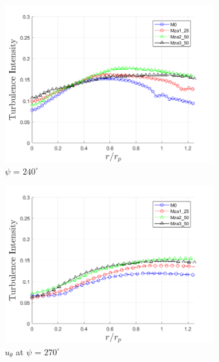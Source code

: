 \begin{figure}[H]
	\centering
	\begin{subfigure}[b]{0.475\textwidth}
		\centering
		\includegraphics[width=1\textwidth]{figures/zonal_adapt_results/LEV/u_theta/TI_phase_240.png}
		\caption{$\psi$ = $240^\circ$}
		\label{fig:zonal_TI_240}
	\end{subfigure}
	\begin{subfigure}[b]{0.475\textwidth}
		\centering
		\includegraphics[width=1\textwidth]{figures/zonal_adapt_results/LEV/u_theta/TI_phase_270.png}
		\caption{$u_\theta$ at $\psi$ = $270^\circ$}
		\label{fig:zonal_TI_270}
	\end{subfigure}
	\begin{subfigure}[b]{0.475\textwidth}

\end{subfigure}
\end{figure}
